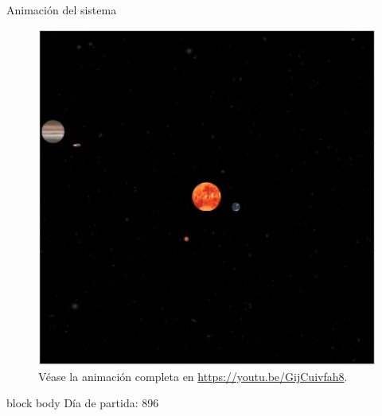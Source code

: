 \documentclass{beamer}
\begin{document}
\begin{frame}{Animación del sistema}{}
\begin{minipage}[t]{0.49\textwidth}
\begin{figure}[H!]
                        \includegraphics[width=\textwidth]{./animacion_jupiter_2}
                        \caption*{Véase la animación completa en \url{https://youtu.be/GijCuivfah8}.}
                        \label{fig:jupiter_2}
                    \end{figure}
                    \vspace*{-0.5cm}
                    \begin{beamercolorbox}[sep=5pt,center]{block body}
                        \centering
                        \small{Día de partida: 896}
                    \end{beamercolorbox}
                \end{minipage}
            \end{frame}
\end{document}
